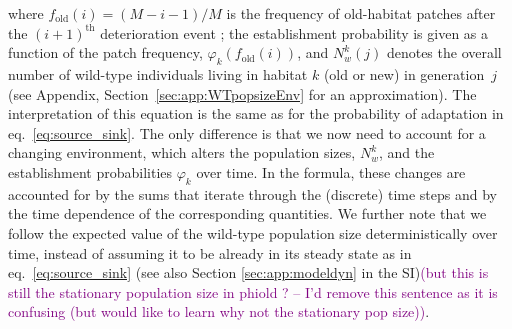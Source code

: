\documentclass[11pt]{article}
\newcommand{\florence}[1]{\textcolor{purple}{(#1)}} %
\newcommand{\chg}[1]{\textcolor{change}{#1}}
\begin{document}
where $f_{\text{old}}(i) = (M-i-1)/M$ is the frequency of old-habitat patches after the $(i+1)^{\text{th}}$ deterioration event ; the establishment probability is given as a function of the patch frequency, $\varphi_k(f_{\text{old}}(i))$, and $N_w^{k}(j)$ denotes the overall number of wild-type individuals living in habitat $k$ (old or new) in generation~$j$(see Appendix, Section~\ref{sec:app:WTpopsizeEnv} for an approximation). The interpretation of this equation is the same as for the probability of adaptation in eq.~\eqref{eq:source_sink}. The only difference is that we now need to account for a changing environment, which alters the population sizes, $N_w^k$, and the establishment probabilities $\varphi_k$ over time. In the formula, these changes are accounted for by the sums that iterate through the (discrete) time steps and by the time dependence of the corresponding quantities. We further note that we follow the expected value of the wild-type population size deterministically over time, instead of assuming it to be already in its steady state as in eq.~\eqref{eq:source_sink} \chg{(see also Section \ref{sec:app:modeldyn} in the SI)}\florence{but this is still the stationary population size in phiold ? -- I'd remove this sentence as it is confusing (but would like to learn why not the stationary pop size)}.
\end{document}
